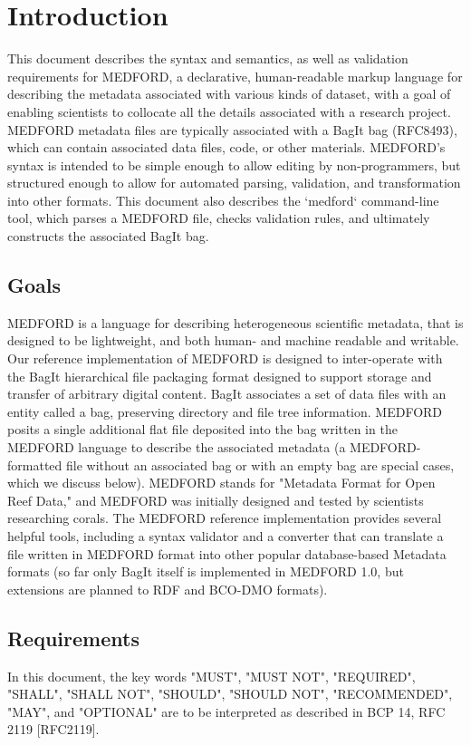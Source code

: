 \documentclass[10pt]{article}
\begin{document}
\section{Introduction}{

    This document describes the syntax and semantics, as well as validation requirements for MEDFORD, a declarative, human-readable markup language for describing the metadata associated with various kinds of dataset, with a goal of enabling scientists to collocate all the details associated with a research project. MEDFORD metadata files are typically associated with a BagIt bag (RFC8493), which can contain associated data files, code, or other materials. MEDFORD's syntax is intended to be simple enough to allow editing by non-programmers, but structured enough to allow for automated parsing, validation, and transformation into other formats. This document also describes the `medford` command-line tool, which parses a MEDFORD file, checks validation rules, and ultimately constructs the associated BagIt bag.

	\subsection{Goals}{MEDFORD is a language for describing heterogeneous scientific metadata, that is designed to be lightweight, and both human- and machine readable and writable. Our reference implementation of MEDFORD is designed to inter-operate with the BagIt hierarchical file packaging format designed to support storage and transfer of arbitrary digital content. BagIt associates a set of data files with an entity called a bag, preserving directory and file tree information. MEDFORD posits a single additional flat file deposited into the bag written in the MEDFORD language to describe the associated metadata (a MEDFORD-formatted file without an associated bag or with an empty bag are special cases, which we discuss below). MEDFORD stands for "Metadata Format for Open Reef Data," and MEDFORD was initially designed and tested by scientists researching corals. The MEDFORD reference implementation provides several helpful tools, including a syntax validator and a converter that can translate a file written in  MEDFORD format into other popular database-based Metadata  formats (so far only BagIt itself is implemented in MEDFORD 1.0, but extensions are planned to RDF and BCO-DMO formats). 
		
	}
	\subsection{Requirements}{
	    In this document, the key words "MUST", "MUST NOT", "REQUIRED",
	    "SHALL", "SHALL NOT", "SHOULD", "SHOULD NOT", "RECOMMENDED", "MAY",
	    and "OPTIONAL" are to be interpreted as described in BCP 14, RFC 2119   [RFC2119].
	    
}}
\end{document}
